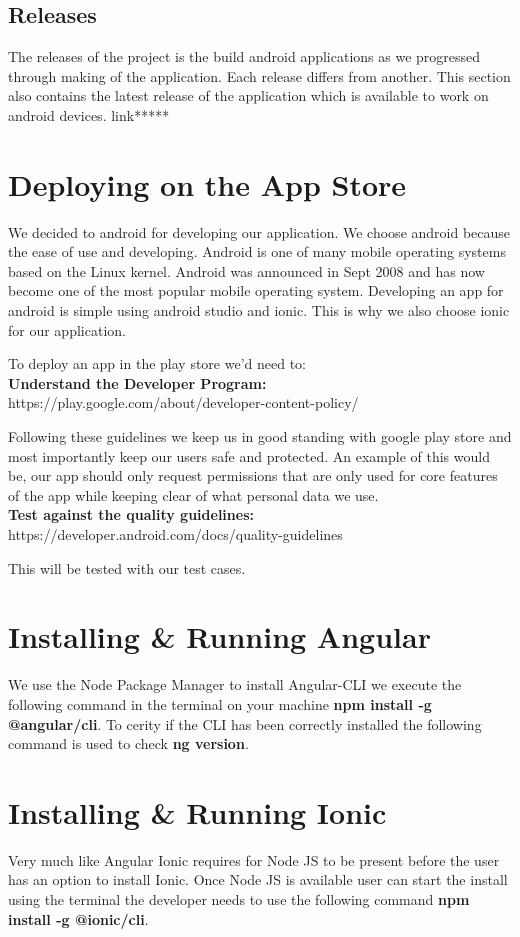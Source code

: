 \documentclass[a4paper,12pt,twoside]{report}
\begin{document}
\subsection{Releases}
The releases of the project is the build android applications as we progressed through making of the application. Each release differs from another. This section also contains the latest release of the application which is available to work on android devices. 
link***** 

\section{Deploying on the App Store}
We decided to android for developing our application. We choose android because the ease of use and developing. Android is one of many mobile operating systems based on the Linux kernel. Android was announced in Sept 2008 and has now become one of the most popular mobile operating system. Developing an app for android is simple using android studio and ionic. This is why we also choose ionic for our application. 

To deploy an app in the play store we'd need to:
\\
\textbf{Understand the Developer Program:} https://play.google.com/about/developer-content-policy/

Following these guidelines we keep us in good standing with google play store and most importantly keep our users safe and protected. An example of this would be, our app should only request permissions that are only used for core features of the app while keeping clear of what personal data we use.
\\
\textbf{Test against the quality guidelines:} https://developer.android.com/docs/quality-guidelines

This will be tested with our test cases.

\section{Installing \& Running Angular}
We use the Node Package Manager to install Angular-CLI we execute the following command in the terminal on your machine \textbf{npm install -g @angular/cli}. To cerity if the CLI has been correctly installed the following command is used to check \textbf{ng version}.

\section{Installing \& Running Ionic }
Very much like Angular Ionic requires for Node JS to be present before the user has an option to install Ionic.
Once Node JS is available user can start the install using the terminal the developer needs to use the following command \textbf{npm install -g @ionic/cli}.
\end{document}

